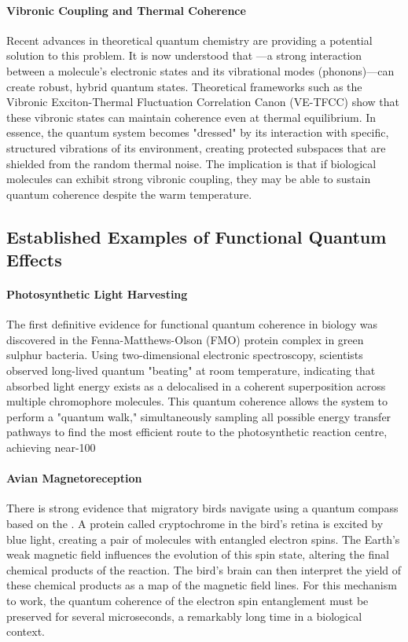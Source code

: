 \paragraph{Vibronic Coupling and Thermal Coherence}
Recent advances in theoretical quantum chemistry are providing a potential solution to this problem. It is now understood that —a strong interaction between a molecule's electronic states and its vibrational modes (phonons)—can create robust, hybrid quantum states. Theoretical frameworks such as the Vibronic Exciton-Thermal Fluctuation Correlation Canon (VE-TFCC) show that these vibronic states can maintain coherence even at thermal equilibrium. In essence, the quantum system becomes "dressed" by its interaction with specific, structured vibrations of its environment, creating protected subspaces that are shielded from the random thermal noise. The implication is that if biological molecules can exhibit strong vibronic coupling, they may be able to sustain quantum coherence despite the warm temperature.
\subsection{Established Examples of Functional Quantum Effects}
\paragraph{Photosynthetic Light Harvesting}
The first definitive evidence for functional quantum coherence in biology was discovered in the Fenna-Matthews-Olson (FMO) protein complex in green sulphur bacteria. Using two-dimensional electronic spectroscopy, scientists observed long-lived quantum "beating" at room temperature, indicating that absorbed light energy exists as a delocalised  in a coherent superposition across multiple chromophore molecules. This quantum coherence allows the system to perform a "quantum walk," simultaneously sampling all possible energy transfer pathways to find the most efficient route to the photosynthetic reaction centre, achieving near-100%
\paragraph{Avian Magnetoreception}
There is strong evidence that migratory birds navigate using a quantum compass based on the . A protein called cryptochrome in the bird's retina is excited by blue light, creating a pair of molecules with entangled electron spins. The Earth's weak magnetic field influences the evolution of this spin state, altering the final chemical products of the reaction. The bird's brain can then interpret the yield of these chemical products as a map of the magnetic field lines. For this mechanism to work, the quantum coherence of the electron spin entanglement must be preserved for several microseconds, a remarkably long time in a biological context.
